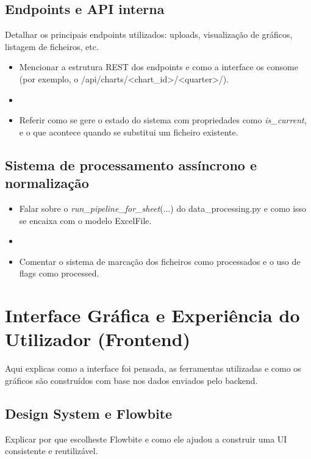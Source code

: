 \subsection{Endpoints e API interna}

    Detalhar os principais endpoints utilizados: uploads, visualização de gráficos, listagem de ficheiros, etc.

    \begin{itemize}
        \item Mencionar a estrutura REST dos endpoints e como a interface os consome (por exemplo, o /api/charts/<chart_id>/<quarter>/).
        \item 
        \item Referir como se gere o estado do sistema com propriedades como \textit{is_current}, e o que acontece quando se substitui um ficheiro existente.
    \end{itemize}

\subsection{Sistema de processamento assíncrono e normalização}

    \begin{itemize}
        \item Falar sobre o \textit{run_pipeline_for_sheet}(...) do data_processing.py e como isso se encaixa com o modelo ExcelFile.
        \item 
        \item Comentar o sistema de marcação dos ficheiros como processados e o uso de flags como processed.
    \end{itemize}



    \section{Interface Gráfica e Experiência do Utilizador (Frontend)}

Aqui explicas como a interface foi pensada, as ferramentas utilizadas e como os gráficos são construídos com base nos dados enviados pelo backend.
\subsection{Design System e Flowbite}

    Explicar por que escolheste Flowbite e como ele ajudou a construir uma UI consistente e reutilizável.

